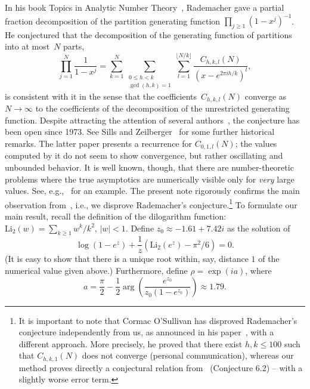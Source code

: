 \documentclass[a4paper]{amsart}
\begin{document}
In his book Topics in Analytic Number Theory~\cite{Ra73},
Rademacher gave a partial fraction decomposition of the
partition generating function $\prod_{j\geq 1}(1-x^j)^{-1}$.
He conjectured that the decomposition
of the generating function of partitions into at most~$N$
parts,
\[
  \prod_{j=1}^N \frac{1}{1-x^j} = \sum_{k=1}^N
    \sum_{\substack{0\leq h<k \\ \gcd(h,k)=1}} \sum_{l=1}^{\lfloor N/k \rfloor}
    \frac{C_{h,k,l}(N)}{(x-e^{2\pi i h/k})^l},
\]
is consistent with it in the sense that the coefficients~$C_{h,k,l}(N)$
converge as $N\to\infty$ to the coefficients of the decomposition
of the unrestricted generating function.
Despite attracting the attention of several authors~\cite{An07,Eh93,Mu08},
the conjecture has been open since 1973.
See Sills and Zeilberger~\cite{SiZe13} for some further historical remarks.
The latter paper presents a recurrence
for $C_{0,1,l}(N)$; the values computed by it
do not seem to show convergence, but 
rather  oscillating and unbounded behavior.
It is well known, though, that there are number-theoretic problems
where the true asymptotics are numerically visible only
for \emph{very} large values. See, e.g.,~\cite{Ge10a} for an example.
The present note rigorously confirms the main observation
from~\cite{SiZe13}, i.e., we disprove Rademacher's
conjecture.\footnote{It is important to note that Cormac O'Sullivan
has disproved Rademacher's conjecture independently from us,
as announced  in his paper~\cite{oS12}, with a different approach.
More precisely, he proved that there exist $h,k \le 100$ such
that $C_{h,k,1}(N)$  does not converge (personal communication), whereas our method
proves directly a conjectural relation from~\cite{oS12} (Conjecture 6.2)
-- with a slightly worse error term.
}
To formulate our main result, recall the definition of the dilogarithm function: $\mathrm{Li}_2(w)
= \sum_{k\geq1}w^k/k^2$, $|w|<1$.  Define $z_0\approx -1.61 + 7.42i$
as the solution of
\begin{equation}\label{eq:z0}
  \log(1-e^z) + \frac{1}{z}(\mathrm{Li}_2(e^z)-\pi^2/6) = 0.
\end{equation}
(It is easy to show that there is a unique root within, say, distance
$1$ of the numerical value given above.)
Furthermore, define $\rho=\exp(i a)$, where
\begin{equation}\label{eq:a}
  a = \frac{ \pi}{2} - \frac12 \arg\left( \frac{e^{z_0}}{z_0(1-e^{z_0})} \right) \approx 1.79.
\end{equation}
\end{document}
